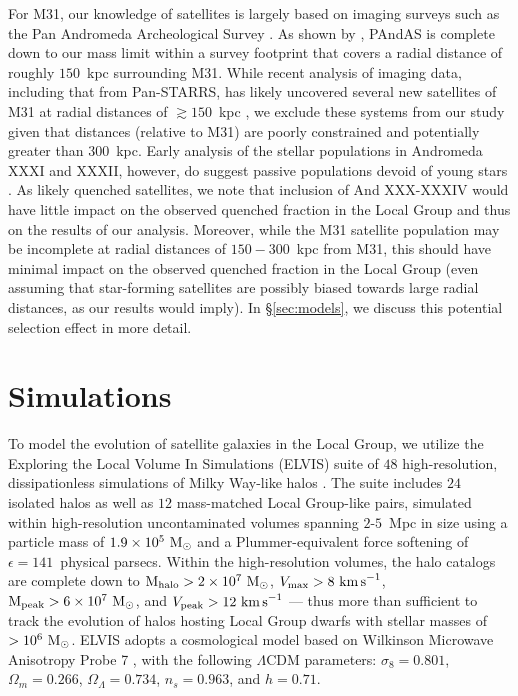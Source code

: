 For M31, our knowledge of satellites is largely based on imaging
surveys such as the Pan Andromeda Archeological Survey
\citep[PAndAS,][see also
\citealt{ferguson02,ibata07,mcconnachie08}]{mcconnachie09}. As shown
by \citet{brasseur11}, PAndAS is complete down to our mass limit
within a survey footprint that covers a radial distance of roughly
$150$~kpc surrounding M31. While recent analysis of imaging data,
including that from Pan-STARRS, has likely uncovered several new
satellites of M31 at radial distances of $\gtrsim 150$~kpc \citep[And
XXX-XXXIV,][]{conn12, martin13a, martin13b, martin14}, we exclude
these systems from our study given that distances (relative to M31)
are poorly constrained and potentially greater than $300$~kpc. Early
analysis of the stellar populations in Andromeda XXXI and XXXII,
however, do suggest passive populations devoid of young stars
\citep{martin13a}. As likely quenched satellites, we note that
inclusion of And XXX-XXXIV would have little impact on the observed
quenched fraction in the Local Group and thus on the results of our
analysis. Moreover, while the M31 satellite population may be
incomplete at radial distances of $150 - 300$~kpc from M31, this
should have minimal impact on the observed quenched fraction in the
Local Group (even assuming that star-forming satellites are possibly
biased towards large radial distances, as our results would imply). In
\S\ref{sec:models}, we discuss this potential selection effect in more
detail.





\section{Simulations}
\label{sec:ELVIS}


To model the evolution of satellite galaxies in the Local Group, we
utilize the Exploring the Local Volume In Simulations (ELVIS) suite of
$48$ high-resolution, dissipationless simulations of Milky Way-like
halos \citep{gk14}. The suite includes $24$ isolated halos as well as
$12$ mass-matched Local Group-like pairs, simulated within
high-resolution uncontaminated volumes spanning $2$-$5$~Mpc in size
using a particle mass of $1.9 \times 10^{5}~{\rm M}_{\odot}$ and a
Plummer-equivalent force softening of $\epsilon = 141$~physical
parsecs. Within the high-resolution volumes, the halo catalogs are
complete down to ${\rm M}_{\rm halo} > 2 \times 10^{7}~{\rm M}_{\odot}$, $V_{\rm
  max} > 8~{\rm km \, s}^{-1}$, ${\rm M}_{\rm peak} > 6 \times 10^{7}~{\rm M}_{\odot}$, and
$V_{\rm peak} > 12~{\rm km \, s}^{-1}$ --- thus more than sufficient to track the
evolution of halos hosting Local Group dwarfs with stellar masses of
$> 10^{6}~{\rm M}_{\odot}$. ELVIS adopts a cosmological model based on
{Wilkinson Microwave Anisotropy Probe 7} \citep{komatsu11}, with the
following $\Lambda$CDM parameters: $\sigma_{8}=0.801$,
$\Omega_{m}=0.266$, $\Omega_{\Lambda}=0.734$, $n_{s}=0.963$, and
$h=0.71$.



